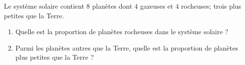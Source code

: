 
\begin{exercice}\label{exo2smath-0318}

    Le système solaire contient \( 8\) planètes dont \( 4\) gazeuses et \( 4\) rocheuses; trois plus petites que la Terre.
    \begin{enumerate}
        \item
            Quelle est la proportion de planètes rocheuses dans le système solaire ?
        \item
            Parmi les planètes autres que la Terre, quelle est la proportion de planètes plus petites que la Terre ?
    \end{enumerate}

\end{exercice}

